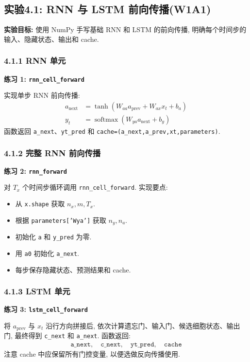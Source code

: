 \documentclass{../../nndlcourse}
\begin{document}
\subsection*{实验4.1: RNN 与 LSTM 前向传播(W1A1)}

\textbf{实验目标: }使用 NumPy 手写基础 RNN 和 LSTM 的前向传播, 明确每个时间步的输入、隐藏状态、输出和 cache.

\subsubsection*{4.1.1 RNN 单元}

\textbf{练习 1: \texttt{rnn\_cell\_forward}}

实现单步 RNN 前向传播:
\begin{align}
    a_{\mathrm{next}} &= \tanh(W_{aa}a_{\mathrm{prev}} + W_{ax}x_t + b_a) \\
    y_t &= \operatorname{softmax}(W_{ya}a_{\mathrm{next}} + b_y)
\end{align}
函数返回 \texttt{a\_next}、\texttt{yt\_pred} 和 \texttt{cache=(a\_next,a\_prev,xt,parameters)}.

\subsubsection*{4.1.2 完整 RNN 前向传播}

\textbf{练习 2: \texttt{rnn\_forward}}

对 $T_x$ 个时间步循环调用 \texttt{rnn\_cell\_forward}. 实现要点:
\begin{itemize}
    \item 从 \texttt{x.shape} 获取 $n_x,m,T_x$.
    \item 根据 \texttt{parameters['Wya']} 获取 $n_y,n_a$.
    \item 初始化 \texttt{a} 和 \texttt{y\_pred} 为零.
    \item 用 \texttt{a0} 初始化 \texttt{a\_next}.
    \item 每步保存隐藏状态、预测结果和 cache.
\end{itemize}

\subsubsection*{4.1.3 LSTM 单元}

\textbf{练习 3: \texttt{lstm\_cell\_forward}}

将 $a_{\mathrm{prev}}$ 与 $x_t$ 沿行方向拼接后, 依次计算遗忘门、输入门、候选细胞状态、输出门, 最终得到 \texttt{c\_next} 和 \texttt{a\_next}. 函数返回:
\begin{align}
    \texttt{a\_next},\quad \texttt{c\_next},\quad \texttt{yt\_pred},\quad \texttt{cache}
\end{align}
注意 cache 中应保留所有门控变量, 以便选做反向传播使用.
\end{document}
